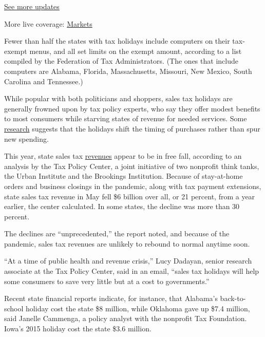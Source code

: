 \href{https://www.nytimes.com/2020/08/01/world/coronavirus-covid-19.html?action=click\&pgtype=Article\&state=default\&region=MAIN_CONTENT_1\&context=storylines_live_updates}{See
more updates}

More live coverage:
\href{https://www.nytimes.com/live/2020/07/31/business/stock-market-today-coronavirus?action=click\&pgtype=Article\&state=default\&region=MAIN_CONTENT_1\&context=storylines_live_updates}{Markets}

Fewer than half the states with tax holidays include computers on their
tax-exempt menus, and all set limits on the exempt amount, according to
a list compiled by the Federation of Tax Administrators. (The ones that
include computers are Alabama, Florida, Massachusetts, Missouri, New
Mexico, South Carolina and Tennessee.)

While popular with both politicians and shoppers, sales tax holidays are
generally frowned upon by tax policy experts, who say they offer modest
benefits to most consumers while starving states of revenue for needed
services. Some
\href{https://www.federalreserve.gov/econres/notes/feds-notes/effect-of-sales-tax-holidays-on-consumer-spending-20170324.htm}{research}
suggests that the holidays shift the timing of purchases rather than
spur new spending.

This year, state sales tax
\href{https://www.taxpolicycenter.org/taxvox/covid-19-effect-state-sales-tax-receipts-shrank-6-billion-may}{revenues}
appear to be in free fall, according to an analysis by the Tax Policy
Center, a joint initiative of two nonprofit think tanks, the Urban
Institute and the Brookings Institution. Because of stay-at-home orders
and business closings in the pandemic, along with tax payment
extensions, state sales tax revenue in May fell \$6 billion over all, or
21 percent, from a year earlier, the center calculated. In some states,
the decline was more than 30 percent.

The declines are ``unprecedented,'' the report noted, and because of the
pandemic, sales tax revenues are unlikely to rebound to normal anytime
soon.

``At a time of public health and revenue crisis,'' Lucy Dadayan, senior
research associate at the Tax Policy Center, said in an email, ``sales
tax holidays will help some consumers to save very little but at a cost
to governments.''

Recent state financial reports indicate, for instance, that Alabama's
back-to-school holiday cost the state \$8 million, while Oklahoma gave
up \$7.4 million, said Janelle Cammenga, a policy analyst with the
nonprofit Tax Foundation. Iowa's 2015 holiday cost the state \$3.6
million.

